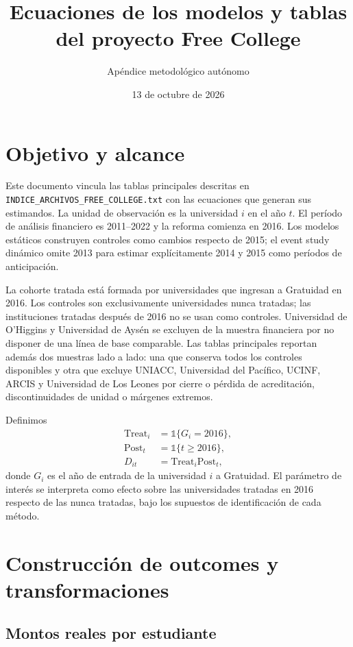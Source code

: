 \documentclass[11pt]{article}
\title{Ecuaciones de los modelos y tablas del proyecto Free College}
\author{Apéndice metodológico autónomo}
\date{13 de octubre de 2026}
\newcommand{\Treat}{\mathrm{Treat}}
\newcommand{\Post}{\mathrm{Post}}
\newcommand{\ind}{\mathbb{1}}
\newcommand{\file}[1]{\texttt{#1}}
\begin{document}
\maketitle
\tableofcontents
\bigskip

\section{Objetivo y alcance}

Este documento vincula las tablas principales descritas en
\file{INDICE\_ARCHIVOS\_FREE\_COLLEGE.txt} con las ecuaciones que generan sus
estimandos. La unidad de observación es la universidad $i$ en el año $t$. El
período de análisis financiero es 2011--2022 y la reforma comienza en 2016. Los
modelos estáticos construyen controles como cambios respecto de 2015; el event
study dinámico omite 2013 para estimar explícitamente 2014 y 2015 como períodos
de anticipación.

La cohorte tratada está formada por universidades que ingresan a Gratuidad en
2016. Los controles son exclusivamente universidades nunca tratadas; las
instituciones tratadas después de 2016 no se usan como controles. Universidad
de O'Higgins y Universidad de Aysén se excluyen de la muestra financiera por no
disponer de una línea de base comparable. Las tablas principales reportan además
dos muestras lado a lado: una que conserva todos los controles disponibles y
otra que excluye UNIACC, Universidad del Pacífico, UCINF, ARCIS y Universidad de
Los Leones por cierre o pérdida de acreditación, discontinuidades de unidad o
márgenes extremos.

Definimos
\begin{align}
  \Treat_i &= \ind\{G_i=2016\}, \\
  \Post_t  &= \ind\{t\geq 2016\}, \\
  D_{it}   &= \Treat_i\Post_t,
\end{align}
donde $G_i$ es el año de entrada de la universidad $i$ a Gratuidad. El
parámetro de interés se interpreta como efecto sobre las universidades tratadas
en 2016 respecto de las nunca tratadas, bajo los supuestos de identificación de
cada método.

\section{Construcción de outcomes y transformaciones}

\subsection{Montos reales por estudiante}
\end{document}
